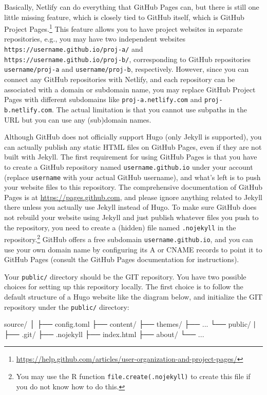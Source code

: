 \documentclass[12pt,]{krantz}
\makeatletter
\newenvironment{Shaded}{\begin{snugshade}}{\end{snugshade}}
\newcommand{\ExtensionTok}[1]{#1}
\newcommand{\KeywordTok}[1]{\textcolor[rgb]{0.13,0.29,0.53}{\textbf{#1}}}
\newcommand{\NormalTok}[1]{#1}
\renewcommand{\href}[2]{#2\footnote{\url{#1}}}
\newenvironment{kframe}{%
\medskip{}
\setlength{\fboxsep}{.8em}
 \def\at@end@of@kframe{}%
 \ifinner\ifhmode%
  \def\at@end@of@kframe{\end{minipage}}%
  \begin{minipage}{\columnwidth}%
 \fi\fi%
 \def\FrameCommand##1{\hskip\@totalleftmargin \hskip-\fboxsep
 \colorbox{shadecolor}{##1}\hskip-\fboxsep
     \hskip-\linewidth \hskip-\@totalleftmargin \hskip\columnwidth}%
 \MakeFramed {\advance\hsize-\width
   \@totalleftmargin\z@ \linewidth\hsize
   \@setminipage}}%
 {\par\unskip\endMakeFramed%
 \at@end@of@kframe}
\renewenvironment{Shaded}{\begin{kframe}}{\end{kframe}}
\theoremstyle{definition}
\theoremstyle{definition}
\theoremstyle{definition}
\theoremstyle{remark}
\makeatother
\begin{document}
Basically, Netlify can do everything that GitHub Pages can, but there is
still one little missing feature, which is closely tied to GitHub
itself, which is GitHub
\href{https://help.github.com/articles/user-organization-and-project-pages/}{Project
Pages.} This feature allows you to have project websites in separate
repositories, e.g., you may have two independent websites
\texttt{https://username.github.io/proj-a/} and
\texttt{https://username.github.io/proj-b/}, corresponding to GitHub
repositories \texttt{username/proj-a} and \texttt{username/proj-b},
respectively. However, since you can connect any GitHub repositories
with Netlify, and each repository can be associated with a domain or
subdomain name, you may replace GitHub Project Pages with different
subdomains like \texttt{proj-a.netlify.com} and
\texttt{proj-b.netlify.com}. The actual limitation is that you cannot
use subpaths in the URL but you can use any (sub)domain names.

Although GitHub does not officially support Hugo (only Jekyll is
supported), you can actually publish any static HTML files on GitHub
Pages, even if they are not built with Jekyll. The first requirement for
using GitHub Pages is that you have to create a GitHub repository named
\texttt{username.github.io} under your account (replace
\texttt{username} with your actual GitHub username), and what's left is
to push your website files to this repository. The comprehensive
documentation of GitHub Pages is at \url{https://pages.github.com}, and
please ignore anything related to Jekyll there unless you actually use
Jekyll instead of Hugo. To make sure GitHub does not rebuild your
website using Jekyll and just publish whatever files you push to the
repository, you need to create a (hidden) file named \texttt{.nojekyll}
in the repository.\footnote{You may use the R function
  \texttt{file.create(\textquotesingle{}.nojekyll\textquotesingle{})} to
  create this file if you do not know how to do this.} GitHub offers a
free subdomain \texttt{username.github.io}, and you can use your own
domain name by configuring its A or CNAME records to point it to GitHub
Pages (consult the GitHub Pages documentation for instructions).

Your \texttt{public/} directory should be the GIT repository. You have
two possible choices for setting up this repository locally. The first
choice is to follow the default structure of a Hugo website like the
diagram below, and initialize the GIT repository under the
\texttt{public/} directory:

\begin{Shaded}
\begin{Highlighting}[]
\ExtensionTok{source/}
\NormalTok{│}
\NormalTok{├── }\ExtensionTok{config.toml}
\NormalTok{├── }\ExtensionTok{content/}
\NormalTok{├── }\ExtensionTok{themes/}
\NormalTok{├── }\ExtensionTok{...}
\NormalTok{└── }\ExtensionTok{public/}
    \KeywordTok{|}
\NormalTok{    ├── }\ExtensionTok{.git/}
\NormalTok{    ├── }\ExtensionTok{.nojekyll}
\NormalTok{    ├── }\ExtensionTok{index.html}
\NormalTok{    ├── }\ExtensionTok{about/}
\NormalTok{    └── }\ExtensionTok{...}
\end{Highlighting}
\end{Shaded}
\end{document}
